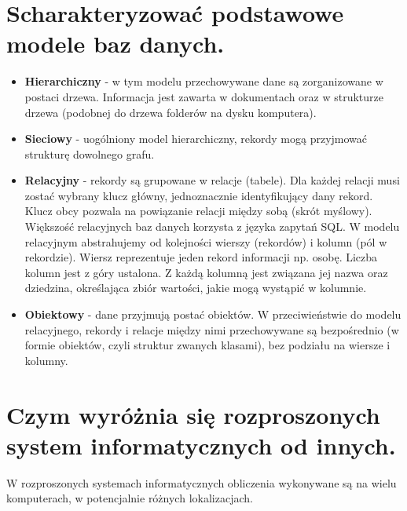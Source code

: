 \documentclass[12pt,a4paper]{article}
\begin{document}
	\section{Scharakteryzować podstawowe modele baz danych.}
	\begin{itemize}
		\item  \textbf{Hierarchiczny} - w tym modelu przechowywane dane są zorganizowane w postaci drzewa. Informacja jest zawarta w dokumentach oraz w strukturze drzewa (podobnej do drzewa folderów na dysku komputera).
		\item  \textbf{Sieciowy} - uogólniony model hierarchiczny, rekordy mogą przyjmować strukturę dowolnego grafu.
		\item  \textbf{Relacyjny} - rekordy są grupowane w relacje (tabele). Dla każdej relacji musi zostać wybrany klucz główny, jednoznacznie identyfikujący dany rekord. Klucz obcy pozwala na powiązanie relacji między sobą (skrót myślowy). Większość relacyjnych baz danych korzysta z języka zapytań SQL. W modelu relacyjnym abstrahujemy od kolejności wierszy (rekordów) i kolumn (pól w rekordzie). Wiersz reprezentuje jeden rekord informacji np. osobę. Liczba kolumn jest z góry ustalona. Z każdą kolumną jest związana jej nazwa oraz dziedzina, określająca zbiór wartości, jakie mogą wystąpić w kolumnie.
		\item  \textbf{Obiektowy} - dane przyjmują postać obiektów. W przeciwieństwie do modelu relacyjnego, rekordy i relacje między nimi przechowywane są bezpośrednio (w formie obiektów, czyli struktur zwanych klasami), bez podziału na wiersze i kolumny.
	\end{itemize}

	\section{Czym wyróżnia się rozproszonych system informatycznych od innych.}
	W rozproszonych systemach informatycznych obliczenia wykonywane są na wielu komputerach, w potencjalnie różnych lokalizacjach.
\end{document}

